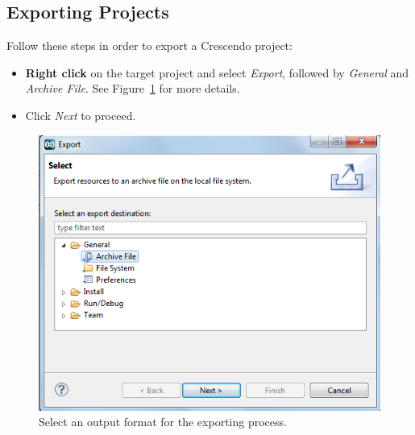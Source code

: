\documentclass{crescendorepchap}
\begin{document}
\subsection{Exporting Projects}

Follow these steps in order to export a Crescendo project:

\begin{itemize}
\item
  \textbf{Right click} on the target project and select \emph{Export}, followed
  by \emph{General} and \emph{Archive File}. See Figure~\ref{fig:export}
  for more details.
\item
  Click \emph{Next} to proceed.
\end{itemize}


\begin{figure}[htbp]
\centering
\includegraphics[width=.6\textwidth]{images/DestecsExportDialog.png}
\caption{Select an output format for the exporting process.\label{fig:export}}
\end{figure}




\end{document}
